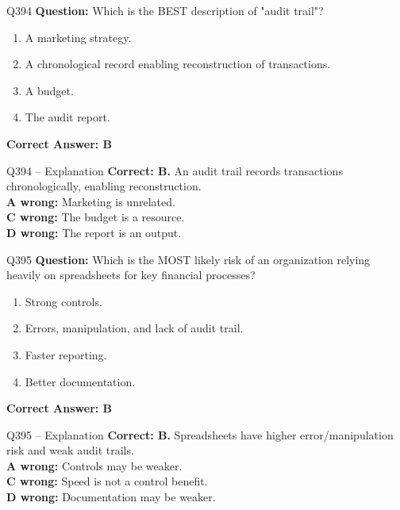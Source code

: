 \documentclass[aspectratio=169,10pt]{beamer}
\begin{document}
	\begin{frame}[t]{Q394}
		\small
		\textbf{Question:} Which is the BEST description of "audit trail"?
		\begin{enumerate}[label=\Alph*.,itemsep=1pt,topsep=2pt]
			\item A marketing strategy.
			\item A chronological record enabling reconstruction of transactions.
			\item A budget.
			\item The audit report.
		\end{enumerate}
		\vspace{4pt}
		\textbf{Correct Answer: B}
	\end{frame}
	
	\begin{frame}[t]{Q394 -- Explanation}
		\small
		\textbf{Correct: B.} An audit trail records transactions chronologically, enabling reconstruction. \\[4pt]
		\textbf{A wrong:} Marketing is unrelated. \\[2pt]
		\textbf{C wrong:} The budget is a resource. \\[2pt]
		\textbf{D wrong:} The report is an output.
	\end{frame}
	
	\begin{frame}[t]{Q395}
		\small
		\textbf{Question:} Which is the MOST likely risk of an organization relying heavily on spreadsheets for key financial processes?
		\begin{enumerate}[label=\Alph*.,itemsep=1pt,topsep=2pt]
			\item Strong controls.
			\item Errors, manipulation, and lack of audit trail.
			\item Faster reporting.
			\item Better documentation.
		\end{enumerate}
		\vspace{4pt}
		\textbf{Correct Answer: B}
	\end{frame}
	
	\begin{frame}[t]{Q395 -- Explanation}
		\small
		\textbf{Correct: B.} Spreadsheets have higher error/manipulation risk and weak audit trails. \\[4pt]
		\textbf{A wrong:} Controls may be weaker. \\[2pt]
		\textbf{C wrong:} Speed is not a control benefit. \\[2pt]
		\textbf{D wrong:} Documentation may be weaker.
	\end{frame}
	
\end{document}

